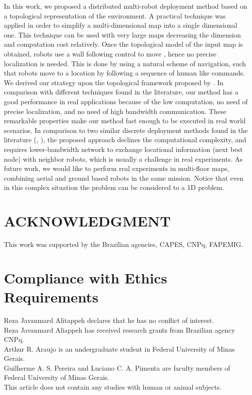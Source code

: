 \documentclass[smallcondensed]{svjour3}
\begin{document}
In this work, we proposed a distributed multi-robot deployment method based on a topological representation of the environment. A practical technique was applied in order to simplify a multi-dimensional map into a single dimensional one. This technique can be used with very large maps decreasing the dimension and computation cost relatively.
%
Once the topological model of the input map is obtained, robots use a wall following control to move , hence no precise localization is needed. This is done by using a natural scheme of navigation, such that robots move to a location by following a sequence of human like commands. 
%
We derived our strategy upon the topological framework proposed by \cite{Arthur2015}. In comparison with different techniques found in the literature, our method has a good performance in real applications because of the low computation, no need of precise localization, and no need of high bandwidth communication. These remarkable properties make our method fast enough to be executed in real world scenarios. 
%
In comparison to two similar discrete deployment methods found in the literature (\cite{Yun2013}, \cite{Durham2012}), the proposed approach declines the computational complexity, and requires lower-bandwidth network to exchange locational information (next best node) with neighbor robots, which is usually a challenge in real experiments.
%
As future work, we would like to perform real experiments in multi-floor maps, combining aerial and ground based robots in the same mission. Notice that even in this complex situation the problem can be considered to a 1D problem.


\section*{ACKNOWLEDGMENT}

This work was supported by the Brazilian agencies, CAPES, CNPq, FAPEMIG.

\section*{Compliance with Ethics Requirements}

Reza Javanmard Alitappeh declares that he has no conflict of interest.\\
Reza Javanmard Aliappeh has received research grants from Brazilian agency CNPq.\\
Arthur R. Araujo is an undergraduate student in Federal University of Minas Gerais.\\
Guilherme A. S. Pereira  and Luciano C. A. Pimenta are faculty members of Federal University of Minas Gerais.\\
This article does not contain any studies with human or animal subjects.


 
\end{document}
